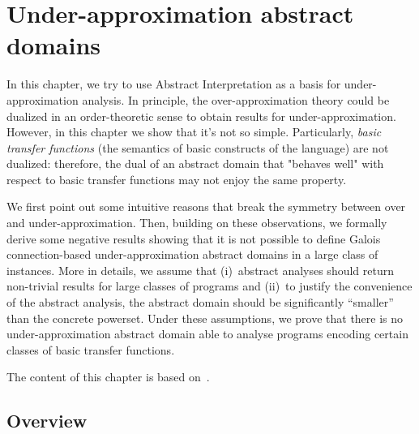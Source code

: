 
\chapter{Under-approximation abstract domains}\label{ch:uai}
In this chapter, we try to use Abstract Interpretation as a basis for under-approximation analysis. In principle, the over-approximation theory could be dualized in an order-theoretic sense to obtain results for under-approximation. However, in this chapter we show that it's not so simple. Particularly, \emph{basic transfer functions} (the semantics of basic constructs of the language) are not dualized: therefore, the dual of an abstract domain that "behaves well" with respect to basic transfer functions may not enjoy the same property.

We first point out some intuitive reasons that break the symmetry between over and under-approximation. Then, building on these observations, we formally derive some negative results showing that it is not possible to define Galois connection-based under-approximation abstract domains in a large class of instances. More in details, we assume that (i)~abstract analyses should return non-trivial results for large classes of programs and (ii)~to justify the convenience of the abstract analysis, the abstract domain should be significantly “smaller” than the concrete powerset. Under these assumptions, we prove that there is no under-approximation abstract domain able to analyse programs encoding certain classes of basic transfer functions.

The content of this chapter is based on~\cite{ABG22,ABG24}.

\section{Overview}

